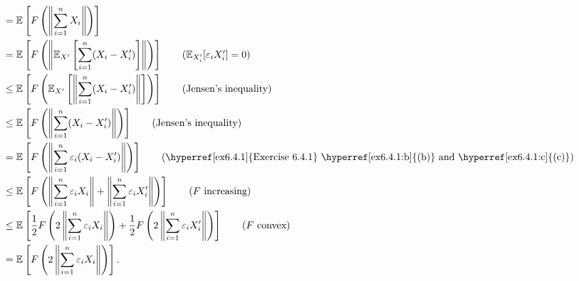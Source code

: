 \begin{answer}
\begin{align*}
		 & = \mathbb{E}_{}\left[F \left( \left\lVert \sum_{i=1}^{n} X_i \right\rVert \right) \right]                                                                                                                                                               \\
		 & = \mathbb{E}_{}\left[F \left( \left\lVert \mathbb{E}_{X^{\prime} }\left[ \sum_{i=1}^{n} (X_i - X_i^{\prime} ) \right] \right\rVert \right) \right] \tag*{(\(\mathbb{E}_{X^{\prime}_i }[\varepsilon _i X_i^{\prime} ] = 0 \))}                           \\
		 & \leq \mathbb{E}_{}\left[F \left( \mathbb{E}_{X^{\prime} }\left[ \left\lVert \sum_{i=1}^{n} (X_i - X_i^{\prime} ) \right\rVert \right] \right) \right] \tag*{(Jensen's inequality)}                                                                      \\
		 & \leq \mathbb{E}_{}\left[F \left( \left\lVert \sum_{i=1}^{n} (X_i - X_i^{\prime} ) \right\rVert \right) \right] \tag*{(Jensen's inequality)}                                                                                                             \\
		 & = \mathbb{E}_{}\left[F \left( \left\lVert \sum_{i=1}^{n} \varepsilon _i (X_i - X_i^{\prime} ) \right\rVert \right) \right] \tag*{(\hyperref[ex6.4.1]{Exercise 6.4.1} \hyperref[ex6.4.1:b]{(b)} and \hyperref[ex6.4.1:c]{(c)})}                          \\
		 & \leq \mathbb{E}_{}\left[F \left( \left\lVert \sum_{i=1}^{n} \varepsilon _i X_i \right\rVert + \left\lVert \sum_{i=1}^{n} \varepsilon _i X_i^{\prime} \right\rVert \right) \right] \tag*{(\(F\) increasing)}                                             \\
		 & \leq \mathbb{E}_{}\left[\frac{1}{2} F \left( 2 \left\lVert \sum_{i=1}^{n} \varepsilon _i X_i \right\rVert \right) + \frac{1}{2} F\left( 2 \left\lVert \sum_{i=1}^{n} \varepsilon _i X_i^{\prime} \right\rVert \right) \right] \tag*{(\(F\) convex)}     \\
		 & = \mathbb{E}_{}\left[F \left( 2 \left\lVert \sum_{i=1}^{n} \varepsilon _i X_i \right\rVert \right) \right].
	\end{align*}
\end{answer}

